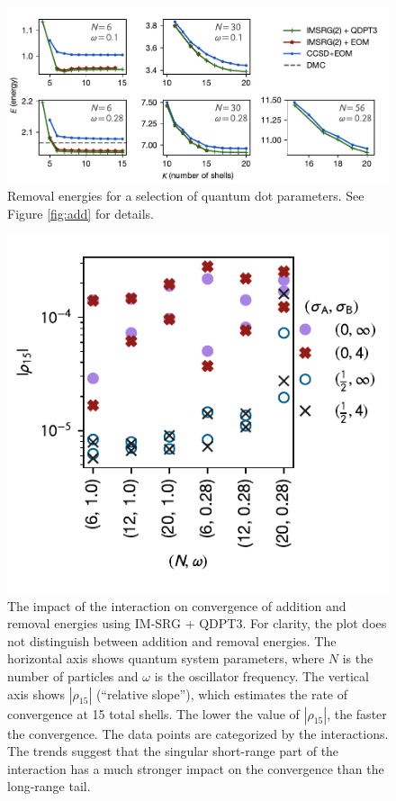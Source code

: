 \begin{figure}
  \centering
  \includegraphics{fig-rm2}
  \caption{Removal energies for a selection of quantum dot parameters.  See Figure \ref{fig:add} for details.}
  \label{fig:rm}
\end{figure}

\begin{figure}
  \centering
  \includegraphics{fig-rel-slopes2}
  \caption{The impact of the interaction on convergence of addition and removal energies using IM-SRG + QDPT3.  For clarity, the plot does not distinguish between addition and removal energies.  The horizontal axis shows quantum system parameters, where $N$ is the number of particles and $\omega$ is the oscillator frequency.  The vertical axis shows $|\rho_{15}|$ (``relative slope''), which estimates the rate of convergence at 15 total shells.  The lower the value of $|\rho_{15}|$, the faster the convergence.  The data points are categorized by the interactions.  The trends suggest that the singular short-range part of the interaction has a much stronger impact on the convergence than the long-range tail.}
  \label{fig:rel-slopes}
\end{figure}

